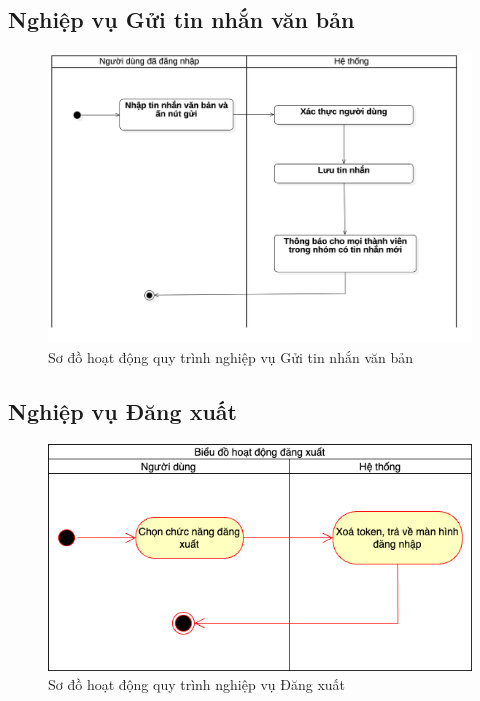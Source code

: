 \documentclass[../DoAn.tex]{subfiles}
\begin{document}
\subsection{Nghiệp vụ Gửi tin nhắn văn bản}
\begin{figure}[H]
   \centering
    \includegraphics[width=1\linewidth]{Hinhve/Activity/Activity_Gui_Tin_Nhan_Van_Ban.png}
    \caption{Sơ đồ hoạt động quy trình nghiệp vụ Gửi tin nhắn văn bản}
    \label{fig:dang_nhap}
\end{figure}

\subsection{Nghiệp vụ Đăng xuất}
\begin{figure}[H]
   \centering
    \includegraphics[width=1\linewidth]{Hinhve/Activity/dang_xuat.png}
    \caption{Sơ đồ hoạt động quy trình nghiệp vụ Đăng xuất}
    \label{fig:dang_xuat}
\end{figure} 
\newpage
\end{document}

